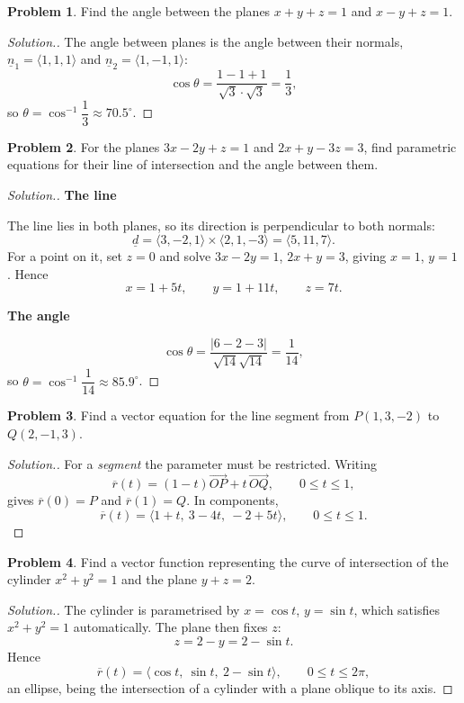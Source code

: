 \documentclass[11pt,a4paper]{article}
\theoremstyle{definition}
\newtheorem{problemx}{Problem}[subsection]
\newenvironment{problem}{\begin{problemx}}{\end{problemx}}
\newenvironment{solution}
  {\renewcommand{\qedsymbol}{}\begin{proof}[\textit{Solution}.]}
  {\end{proof}}
\newcommand{\subhead}[1]{%
  \par\medskip\noindent\textbf{#1}\par\nobreak\smallskip}
\begin{document}
\begin{problem}
Find the angle between the planes $x+y+z=1$ and $x-y+z=1$.
\end{problem}
\begin{solution}
The angle between planes is the angle between their normals,
$\underline{n}_1 = \langle 1,1,1\rangle$ and
$\underline{n}_2 = \langle 1,-1,1\rangle$:
$$\cos\theta = \frac{1-1+1}{\sqrt3\cdot\sqrt3} = \frac13 ,$$
so $\theta = \cos^{-1}\dfrac13\approx 70.5^{\circ}$.
\end{solution}

\begin{problem}
For the planes $3x-2y+z=1$ and $2x+y-3z=3$, find parametric equations for their
line of intersection and the angle between them.
\end{problem}
\begin{solution}
\subhead{The line}
The line lies in both planes, so its direction is perpendicular to both normals:
$$\underline{d} = \langle 3,-2,1\rangle\times\langle 2,1,-3\rangle
= \langle 5,11,7\rangle .$$
For a point on it, set $z=0$ and solve $3x-2y=1$, $2x+y=3$, giving
$x = 1$, $y = 1$. Hence
$$x = 1+5t,\qquad y = 1+11t,\qquad z = 7t .$$

\subhead{The angle}
$$\cos\theta = \frac{\left|6-2-3\right|}{\sqrt{14}\sqrt{14}} = \frac{1}{14},$$
so $\theta = \cos^{-1}\dfrac{1}{14}\approx 85.9^{\circ}$.
\end{solution}

\begin{problem}
Find a vector equation for the line segment from $P(1,3,-2)$ to $Q(2,-1,3)$.
\end{problem}
\begin{solution}
For a \emph{segment} the parameter must be restricted. Writing
$$\overline{r}(t) = (1-t)\overrightarrow{OP} + t\,\overrightarrow{OQ},
\qquad 0\leq t\leq 1 ,$$
gives $\overline{r}(0) = P$ and $\overline{r}(1) = Q$. In components,
$$\overline{r}(t) = \langle 1+t,\ 3-4t,\ -2+5t\rangle,\qquad 0\leq t\leq 1 .$$
\end{solution}

\begin{problem}
Find a vector function representing the curve of intersection of the cylinder
$x^2+y^2=1$ and the plane $y+z=2$.
\end{problem}
\begin{solution}
The cylinder is parametrised by $x = \cos t$, $y = \sin t$, which satisfies
$x^2+y^2=1$ automatically. The plane then fixes $z$:
$$z = 2 - y = 2 - \sin t .$$
Hence
$$\overline{r}(t) = \langle \cos t,\ \sin t,\ 2-\sin t\rangle,
\qquad 0\leq t\leq 2\pi ,$$
an ellipse, being the intersection of a cylinder with a plane oblique to its
axis.
\end{solution}
\end{document}
